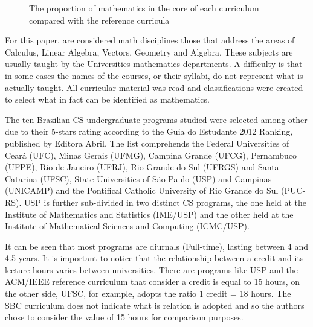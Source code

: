 \documentclass[conference]{IEEEtran}
\begin{document}
\begin{figure}[!t]
\centering
{}
\caption{The proportion of mathematics in the core of each curriculum compared with the reference curricula}
\end{figure}

	For this paper, are considered math disciplines those that address the areas of Calculus, Linear Algebra, Vectors, Geometry and Algebra. These subjects are usually taught by the Universities mathematics departments. A difficulty is that in some cases the names of the courses, or their syllabi, do not represent what is actually taught. All curricular material was read and classifications were created to select what in fact can be identified as mathematics.

	The ten Brazilian CS undergraduate programs studied were selected among other due to their 5-stars rating according to the Guia do Estudante 2012 Ranking, published by Editora Abril. \cite{guia_estudante} The list comprehends the Federal Universities of Ceará (UFC), Minas Gerais (UFMG), Campina Grande (UFCG), Pernambuco (UFPE), Rio de Janeiro (UFRJ), Rio Grande do Sul (UFRGS) and Santa Catarina (UFSC), State Universities of São Paulo (USP) and Campinas (UNICAMP) and the Pontifical Catholic University of Rio Grande do Sul (PUC-RS). USP is further sub-divided in two distinct CS programs, the one held at the Institute of Mathematics and Statistics (IME/USP) and the other held at the Institute of Mathematical Sciences and Computing (ICMC/USP).
	
	It can be seen that most programs are diurnals (Full-time), lasting between 4 and 4.5 years. It is important to notice that the relationship between a credit and its lecture hours varies between universities. There are programs like USP and the ACM/IEEE reference curriculum that consider a credit is equal to 15 hours, on the other side, UFSC, for example, adopts the ratio 1 credit = 18 hours. The SBC curriculum does not indicate what is relation is adopted and so the authors chose to consider the value of 15 hours for comparison purposes.
	
\end{document}
